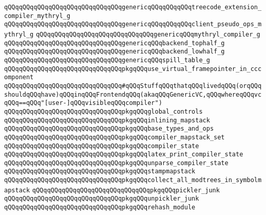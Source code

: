 \newline
\verb|qQQqqQQqqQQqqQQqqQQqqQQqqQQqqQQqgenericqQQqqQQqqQQqtreecode_extension_compiler_mythryl_g|\newline
\verb|qQQqqQQqqQQqqQQqqQQqqQQqqQQqqQQqgenericqQQqqQQqqQQqclient_pseudo_ops_mythryl_g|\newline
\newline
\verb|qQQqqQQqqQQqqQQqqQQqqQQqqQQqqQQqgenericqQQqmythryl_compiler_g|\newline
\verb|qQQqqQQqqQQqqQQqqQQqqQQqqQQqqQQqgenericqQQqbackend_tophalf_g|\newline
\verb|qQQqqQQqqQQqqQQqqQQqqQQqqQQqqQQqgenericqQQqbackend_lowhalf_g|\newline
\verb|qQQqqQQqqQQqqQQqqQQqqQQqqQQqqQQqgenericqQQqspill_table_g|\newline
\newline
\verb|qQQqqQQqqQQqqQQqqQQqqQQqqQQqqQQqpkgqQQquse_virtual_framepointer_in_cccomponent|\newline
\newline
\verb|qQQqqQQqqQQqqQQqqQQqqQQqqQQqqQQq#qQQqStuffqQQqthatqQQqlivedqQQq(orqQQqshouldqQQqhave)qQQqinqQQqFrontendqQQq(akaqQQqGenericVC,qQQqwhereqQQqvcqQQq==qQQq"[user-]qQQqvisibleqQQqcompiler")|\newline
\verb|qQQqqQQqqQQqqQQqqQQqqQQqqQQqqQQqpkgqQQqglobal_controls|\newline
\verb|qQQqqQQqqQQqqQQqqQQqqQQqqQQqqQQqpkgqQQqinlining_mapstack|\newline
\verb|qQQqqQQqqQQqqQQqqQQqqQQqqQQqqQQqpkgqQQqbase_types_and_ops|\newline
\verb|qQQqqQQqqQQqqQQqqQQqqQQqqQQqqQQqpkgqQQqcompiler_mapstack_set|\newline
\verb|qQQqqQQqqQQqqQQqqQQqqQQqqQQqqQQqpkgqQQqcompiler_state|\newline
\verb|qQQqqQQqqQQqqQQqqQQqqQQqqQQqqQQqpkgqQQqlatex_print_compiler_state|\newline
\verb|qQQqqQQqqQQqqQQqqQQqqQQqqQQqqQQqpkgqQQqunparse_compiler_state|\newline
\verb|qQQqqQQqqQQqqQQqqQQqqQQqqQQqqQQqpkgqQQqstampmapstack|\newline
\verb|qQQqqQQqqQQqqQQqqQQqqQQqqQQqqQQqpkgqQQqcollect_all_modtrees_in_symbolmapstack|\newline
\verb|qQQqqQQqqQQqqQQqqQQqqQQqqQQqqQQqpkgqQQqpickler_junk|\newline
\verb|qQQqqQQqqQQqqQQqqQQqqQQqqQQqqQQqpkgqQQqunpickler_junk|\newline
\verb|qQQqqQQqqQQqqQQqqQQqqQQqqQQqqQQqpkgqQQqrehash_module|\newline
